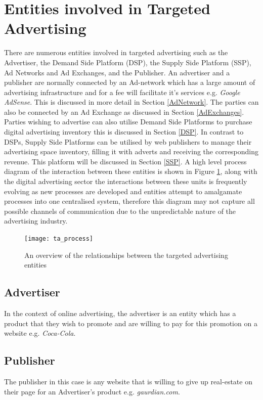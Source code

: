 \documentclass[12pt]{article}
\begin{document}
\section{Entities involved in Targeted Advertising} 
There are numerous entities involved in targeted advertising such as the Advertiser, the Demand Side Platform (DSP), the Supply Side Platform (SSP), Ad Networks and Ad Exchanges, and the Publisher. An advertiser and a publisher are normally connected by an Ad-network which has a large amount of advertising infrastructure and for a fee will facilitate it's services e.g. \textit{Google AdSense}. This is discussed in more detail in Section \ref{AdNetwork}. The parties can also be connected by an Ad Exchange as discussed in Section \ref{AdExchanges}. Parties wishing to advertise can also utilise Demand Side Platforms to purchase digital advertising inventory this is discussed in Section \ref{DSP}. In contrast to DSPs, Supply Side Platforms can be utilised by web publishers to manage their advertising space inventory, filling it with adverts and receiving the corresponding revenue. This platform will be discussed in Section \ref{SSP}. A high level process diagram of the interaction between these entities is shown in Figure \ref{fig:ta_process}, along with the digital advertising sector the interactions between these units is frequently evolving as new processes are developed and entities attempt to amalgamate processes into one centralised system, therefore this diagram may not capture all possible channels of communication due to the unpredictable nature of the advertising industry. 

\begin{figure}[H]
    \centering
    \texttt{[image: ta\_process]}
    \caption{An overview of the relationships between the targeted advertising entities}
    \label{fig:ta_process}
\end{figure}

\subsection{Advertiser}
In the context of online advertising, the advertiser is an entity which has a product that they wish to promote and are willing to pay for this promotion on a website e.g. \textit{Coca-Cola}.

\subsection{Publisher} 
The publisher in this case is any website that is willing to give up real-estate on their page for an Advertiser's product e.g. \textit{gaurdian.com}.
\end{document}
